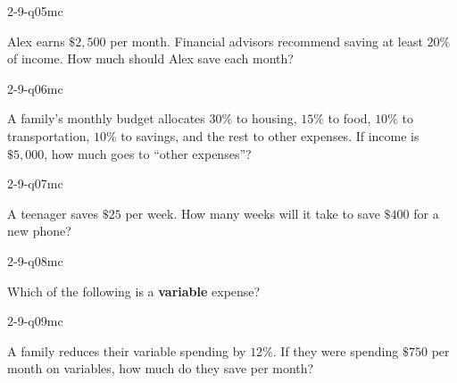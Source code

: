 \begin{practiceQuestion}{2-9-q05}{mc}
\begin{questionText}
Alex earns $\$2{,}500$ per month. Financial advisors recommend saving at least $20\%$ of income. How much should Alex save each month?
\end{questionText}
\end{practiceQuestion}

\begin{practiceQuestion}{2-9-q06}{mc}
\begin{questionText}
A family's monthly budget allocates $30\%$ to housing, $15\%$ to food, $10\%$ to transportation, $10\%$ to savings, and the rest to other expenses. If income is $\$5{,}000$, how much goes to ``other expenses''?
\end{questionText}
\end{practiceQuestion}

\begin{practiceQuestion}{2-9-q07}{mc}
\begin{questionText}
A teenager saves $\$25$ per week. How many weeks will it take to save $\$400$ for a new phone?
\end{questionText}
\end{practiceQuestion}

\begin{practiceQuestion}{2-9-q08}{mc}
\begin{questionText}
Which of the following is a \textbf{variable} expense?
\end{questionText}
\end{practiceQuestion}

\begin{practiceQuestion}{2-9-q09}{mc}
\begin{questionText}
A family reduces their variable spending by $12\%$. If they were spending $\$750$ per month on variables, how much do they save per month?
\end{questionText}
\end{practiceQuestion}

